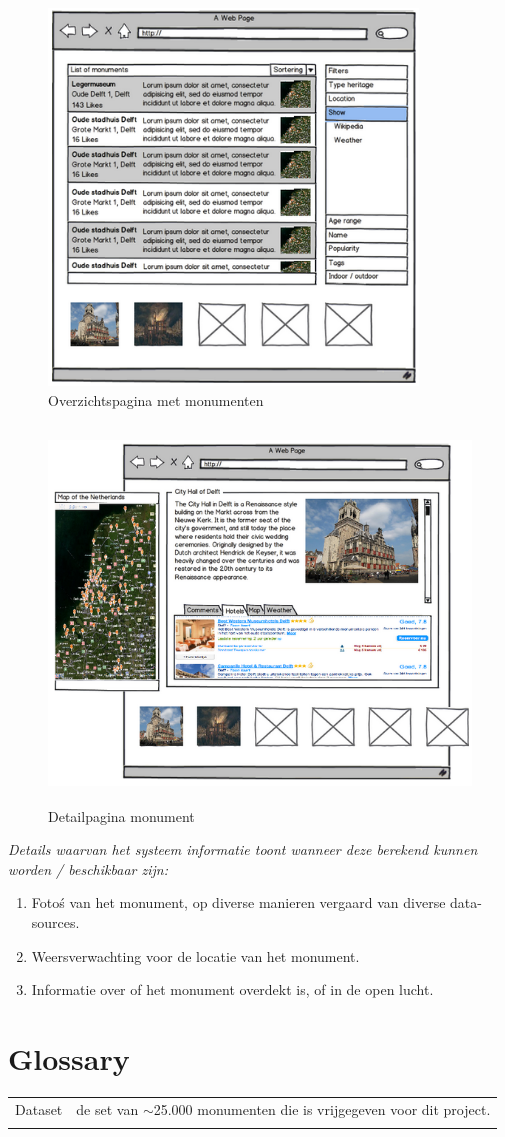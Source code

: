 \documentclass[a4paper,10pt]{article}
\begin{document}
			\begin{figure}[ht!]
				\centering
				\includegraphics[height=10cm]{interface2.png}
				\caption{Overzichtspagina met monumenten \label{interface2}}
			\end{figure}
			
			\begin{figure}[ht!]
				\centering
				\includegraphics[height=10cm]{interface3.png}
				\caption{Detailpagina monument \label{interface3}}
			\end{figure}
			\textit{Details waarvan het systeem informatie toont wanneer deze berekend kunnen worden / beschikbaar zijn:}
			\begin{enumerate}
				\item Foto\'s van het monument, op diverse manieren vergaard van diverse data-sources.
				\item Weersverwachting voor de locatie van het monument.
				\item Informatie over of het monument overdekt is, of in de open lucht.
			\end{enumerate}
	
	\clearpage
	\section{Glossary}
		\begin{tabular}{ l | l }
		Dataset & de set van $\sim$25.000 monumenten die is vrijgegeven voor dit project.\\
		\\
		\end{tabular}
\end{document}
